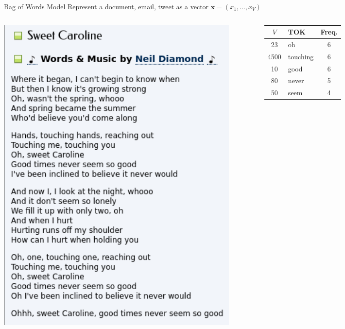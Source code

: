 \documentclass[handout]{beamer}
\newcommand{\bx}{\mathbf{x}}
\begin{document}
\begin{frame}{Bag of Words Model}
    Represent a document, email, tweet as a vector $\bx=(x_1,\ldots, x_V)$
    \begin{columns}[T]
        \begin{column}{0.6\textwidth}
            \includegraphics[width=0.9\textwidth]{sweet_caroline_lyrics.png}
        \end{column}
        \begin{column}{0.4\textwidth}
            \begin{tabular}{|c|l|c|}
                \hline
                \hline
                $V$ & TOK& Freq. \\
                \hline
                \hline
                23 & oh&6\\
                \hline
                4500 & touching&6\\
                \hline
                10 & good&6\\
                \hline
                80 & never&5\\
                \hline
                50 & seem&4\\

\end{tabular}
\end{column}
\end{columns}
\end{frame}
\end{document}
